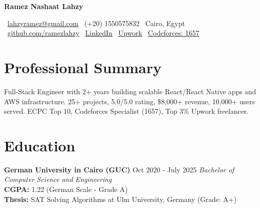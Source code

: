 \documentclass[8pt,a4paper]{article}
\newcommand{\cvheader}[1]{%
    \begin{center}
        {\Large\bfseries\color{primarycolor} #1}
    \end{center}
}
\newcommand{\contactinfo}[1]{%
    \begin{center}
        \small #1
    \end{center}
    \vspace{0.02em}
}
\newcommand{\cventry}[4]{%
    \textbf{#1} \hfill {\small\color{secondarycolor} #2} \hfill {\footnotesize\textit{#3}}\\
    #4
    \vspace{0.02em}
}
\begin{document}

\cvheader{Ramez Nashaat Lahzy}

\contactinfo{
\faEnvelope\ \href{mailto:lahzyramez@gmail.com}{lahzyramez@gmail.com} \quad
\faPhone\ (+20) 1550575832 \quad
\faMapMarker\ Cairo, Egypt \\
\faGithub\ \href{https://github.com/ramezlahzy}{github.com/ramezlahzy} \quad
\faLinkedin\ \href{https://linkedin.com/in/ramez-lahzy-37188021a/}{LinkedIn} \quad
\faGlobe\ \href{https://www.upwork.com/freelancers/ramezn3}{Upwork} \quad
\faCode\ \href{https://codeforces.com/profile/Ramez__}{Codeforces: 1657}
}


\section{Professional Summary}

 Full-Stack Engineer with 2+ years building scalable React/React Native apps and AWS infrastructure. 25+ projects, 5.0/5.0 rating, \$8,000+ revenue, 10,000+ users served. ECPC Top 10, Codeforces Specialist (1657), Top 3\% Upwork freelancer.



\section{Education}

\cventry{German University in Cairo (GUC)}{Oct 2020 - July 2025}{Bachelor of Computer Science and Engineering}{
\textbf{CGPA:} 1.22 (German Scale - Grade A) \\
\textbf{Thesis:} SAT Solving Algorithms at Ulm University, Germany (Grade: A+)
}

\end{document}
